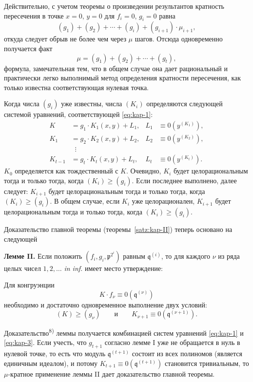 \documentclass[11pt]{article}
\theoremstyle{plain}
\begin{document}
Действительно, с учетом теоремы о произведении результантов кратность
пересечения в точке $x = 0$, $y = 0$ для $f_{i} = 0$, $g_{i} = 0$
равна
\[
(g_{1}) + (g_{2}) + \cdots + (g_{i}) + (g_{i+1}) \cdot \mu_{i+1},
\]
откуда следует обрыв не более чем через $\mu$ шагов. Отсюда
одновременно получается факт
\begin{equation}\label{eq:kap-2}
\mu = (g_{1}) + (g_{2}) + \cdots + (g_{t}),
\end{equation}
формула, замечательная тем, что в общем случае она дает рациональный
и практически легко выполнимый метод определения кратности
пересечения, как только известна соответствующая нулевая точка.

Когда числа $(g_{i})$ уже известны, числа $(K_{i})$ определяются
следующей системой уравнений, соответствующей \eqref{eq:kap-1}:
\begin{equation}\label{eq:kap-3}
\begin{aligned}
K &= g_{1} \cdot K_{1}(x,y) + L_{1}, & L_{1} &\equiv 0(y^{(K_{1})}),\\
K_{1} &= g_{2} \cdot K_{2}(x,y) + L_{2}, & L_{2} &\equiv 0(y^{(K_{2})}),\\
&\;\;\vdots &&\\
K_{t-1} &= g_{t} \cdot K_{t}(x,y) + L_{t}, & L_{t} &\equiv 0(y^{(K_{t})}).
\end{aligned}
\end{equation}
$K_{0}$ определяется как тождественный с $K$. Очевидно, $K_{i}$ будет
целорациональным тогда и только тогда, когда $(K_{i}) \geq (g_{i})$.
Если последнее выполнено, далее следует: $K_{i+1}$ будет
целорациональным тогда и только тогда, когда $(K_{i}) \geq (g_{i})$.
В общем случае, если $K_{i}$ уже целорационален, $K_{i+1}$ будет
целорациональным тогда и только тогда, когда $(K_{i}) \geq (g_{i})$.

Доказательство главной теоремы (теоремы~\ref{satz:kap-II}) теперь
основано на следующей

\smallskip
\textbf{Лемме II.} Если положить
$(f_{i}, g_{i}, \mathfrak{p}^{2^{i}})$ равным
$\mathfrak{q}^{(i)}$, то для каждого $\nu$ из ряда целых чисел
$1, 2, \ldots$ \textit{in inf.} имеет место утверждение:

Для конгруэнции
\[
K \cdot f_{\nu} \equiv 0(\mathfrak{q}^{(\nu)})
\]
необходимо и достаточно одновременное выполнение двух условий:
\[
(K) \geq (g_{\nu}) \qquad \text{и} \qquad K_{\nu+1} \equiv 0(\mathfrak{q}^{(\nu+1)}).
\]

Доказательство\textsuperscript{8)} леммы получается комбинацией
систем уравнений \eqref{eq:kap-1} и \eqref{eq:kap-3}. Если учесть,
что $g_{t+1}$ согласно лемме I уже не обращается в нуль в нулевой
точке, то есть что модуль $\mathfrak{q}^{(t+1)}$ состоит из всех
полиномов (является единичным идеалом), и потому
$K_{t+1} \equiv 0(\mathfrak{q}^{(t+1)})$ становится тривиальным, то
$\mu$-кратное применение леммы II дает доказательство главной
теоремы.
\end{document}

